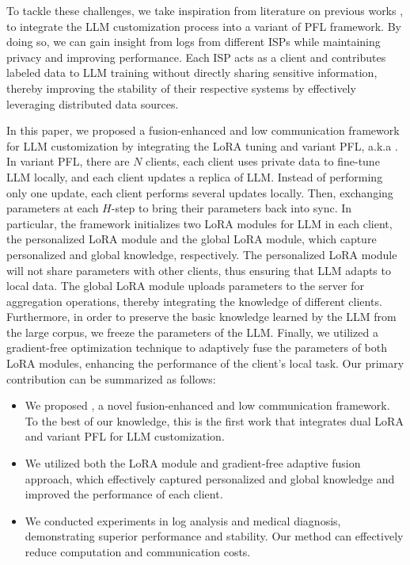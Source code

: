 \documentclass[sigconf]{acmart}
\newcommand\our{\text{FDLoRA}}
\begin{document}
\par
To tackle these challenges, we take inspiration from literature on previous works \cite{huang2023lorahub, douillard2023diloco}, to integrate the LLM customization process into a variant of PFL framework. By doing so, we can gain insight from logs from different ISPs while maintaining privacy and improving performance. Each ISP acts as a client and contributes labeled data to LLM training without directly sharing sensitive information, thereby improving the stability of their respective systems by effectively leveraging distributed data sources.
\par
In this paper, we proposed a fusion-enhanced and low communication framework for LLM customization by integrating the LoRA tuning and variant PFL, a.k.a \textbf{\our{}}. In variant PFL, there are $N$ clients, each client uses private data to fine-tune LLM locally, and each client updates a replica of LLM. Instead of performing only one update, each client performs several updates locally. Then, exchanging parameters at each $H$-step to bring their parameters back into sync. In particular, the framework initializes two LoRA modules for LLM in each client, the personalized LoRA module and the global LoRA module, which capture personalized and global knowledge, respectively. The personalized LoRA module will not share parameters with other clients, thus ensuring that LLM adapts to local data. The global LoRA module uploads parameters to the server for aggregation operations, thereby integrating the knowledge of different clients. Furthermore, in order to preserve the basic knowledge learned by the LLM from the large corpus, we freeze the parameters of the LLM. Finally, we utilized a gradient-free optimization technique to adaptively fuse the parameters of both LoRA modules, enhancing the performance of the client's local task. Our primary contribution can be summarized as follows:


\begin{itemize}
    \item We proposed \our{}, a novel fusion-enhanced and low communication framework. To the best of our knowledge, this is the first work that integrates dual LoRA and variant PFL for LLM customization.
    \item We utilized both the LoRA module and gradient-free adaptive fusion approach, which effectively captured personalized and global knowledge and improved the performance of each client. 
    \item We conducted experiments in log analysis and medical diagnosis, demonstrating superior performance and stability. Our method can effectively reduce computation and communication costs.
\end{itemize}
\end{document}
